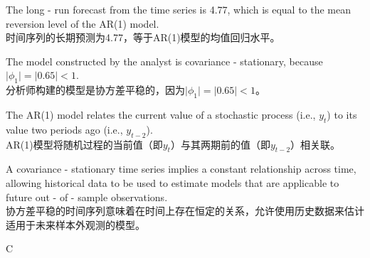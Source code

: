 \documentclass{article}
\begin{document}
    \begin{choices}
        \item The long - run forecast from the time series is 4.77, which is equal to the mean reversion level of the AR(1) model.\\
        时间序列的长期预测为4.77，等于AR(1)模型的均值回归水平。
        \item The model constructed by the analyst is covariance - stationary, because \(\vert\phi_1\vert=\vert0.65\vert < 1\).\\
        分析师构建的模型是协方差平稳的，因为\(\vert\phi_1\vert=\vert0.65\vert < 1\)。
        \item The AR(1) model relates the current value of a stochastic process (i.e., \(y_t\)) to its value two periods ago (i.e., \(y_{t - 2}\)).\\
        AR(1)模型将随机过程的当前值（即\(y_t\)）与其两期前的值（即\(y_{t - 2}\)）相关联。
        \item A covariance - stationary time series implies a constant relationship across time, allowing historical data to be used to estimate models that are applicable to future out - of - sample observations.\\
        协方差平稳的时间序列意味着在时间上存在恒定的关系，允许使用历史数据来估计适用于未来样本外观测的模型。
    \end{choices}
    
    \begin{correctanswer}
        C
    \end{correctanswer}
    
\end{document}
